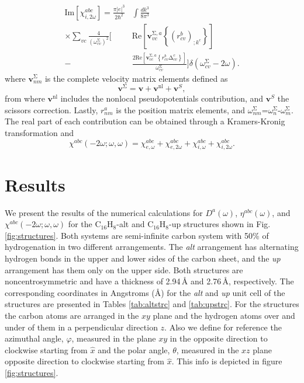 \documentclass[pss]{wiley2sp} %
\begin{document}
\begin{subequations}
\begin{align}
\mathrm{Im}[\chi^{abc}_{i,2\omega}]= 
\frac{\pi \vert e\vert^{3}}{2\hbar^2}
&
\int \frac{dk^3}{8\pi^3}
\nonumber \\
\times \sum_{vc}\frac{4}{(\omega^\mathrm{\Sigma}_{cv})^{2}}
\Bigg[ 
&
\mathrm{Re}\left[\mathbf{v}^{\mathrm{\Sigma},a}_{vc}\left\{
\left(r^{b}_{cv}\right)_{;k^{c}}\right\}\right] 
\nonumber \\
-
&
\frac{2\mathrm{Re}
\left[\mathbf{v}^{\mathrm{\Sigma},a}_{vc}\left\{
r^{b}_{cv}
\mathrm{\Delta}^{c}_{cv}\right\}\right]}{\omega^\mathrm{\Sigma}_{cv}}
\Bigg]
\delta(\omega^\mathrm{\Sigma}_{cv}-2\omega)
.
\end{align}
\end{subequations}
where $\mathbf{v}^{\mathrm{\Sigma}}_{nm}$ is the complete velocity matrix elements defined as
\begin{equation*}\label{eq:nonlocal}
\mathbf{v}^{\mathrm{\Sigma}}=\mathbf{v}+\mathbf{v}^{\mathrm{nl}}+\mathbf{v}^{S},
\end{equation*}
from where $\mathbf{v}^{\mathrm{nl}}$ includes the nonlocal pseudopotentials contribution, and $\mathbf{v}^{S}$ the scissors correction. Lastly, $r^{a}_{nm}$ is the position matrix elements, and $\omega^\mathrm{\Sigma}_{nm}$=$\omega^{\mathrm{\Sigma}}_{n}$-$\omega^{\mathrm{\Sigma}}_{m}$. The real part of each contribution can be obtained through a Kramers-Kronig transformation \cite{tancognePRB14} and
\begin{equation}\label{eq:chitotal}
    \chi^{abc} (-2\omega;\omega,\omega) = \chi^{abc}_{e,\omega} + \chi^{abc}_{e,2\omega} +
    \chi^{abc}_{i,\omega} + \chi^{abc}_{i,2\omega}
    .
\end{equation}

\section{Results}\label{sec:results}

We present the results of the numerical calculations for {$D^{a}(\omega)$}, {$\eta^{abc}(\omega)$}, and $\chi^{abc}(-2\omega;\omega,\omega)$ for the C$_{16}$H$_{8}$-alt and C$_{16}$H$_{8}$-up structures shown in Fig. \ref{fig:structures}. Both systems are semi-infinite carbon system with 50\% of hydrogenation in two different arrangements. The \emph{alt} arrangement has alternating hydrogen bonds in the upper and lower sides of the carbon sheet, and the \emph{up} arrangement has them only on the upper side. Both structures are noncentrosymmetric and have a thickness of 2.94\,{\AA} and 2.76\,{\AA}, respectively. The corresponding coordinates in Angstroms (\AA) for the \emph{alt} and \emph{up} unit cell of the structures are presented in Tables \ref{tab:altstrc} and \ref{tab:upstrc}. For the structures the carbon atoms are arranged in the $xy$ plane and the hydrogen atoms over and under of them in a perpendicular direction $z$. Also we define for reference the azimuthal angle, $\varphi$, measured in the plane $xy$ in the opposite direction to clockwise starting from $\hat{x}$ and the polar angle, $\theta$, measured in the $xz$ plane opposite direction to clockwise starting from $\hat{x}$. This info is depicted in figure \ref{fig:structures}.
\end{document}
